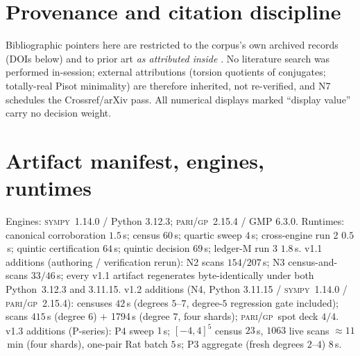 \documentclass[11pt]{article}
\newcommand{\gp}{\textsc{pari/gp}}
\newcommand{\sy}{\textsc{sympy}}
\theoremstyle{definition}
\begin{document}
\section{Provenance and citation discipline}\label{sec:provenance}

Bibliographic pointers here are restricted to the corpus's own archived records
(DOIs below) and to prior art \emph{as attributed inside}
\cite[Rem.~7.20 and refs.~14--16]{relcharge}. No literature search was performed
in-session; external attributions (torsion quotients of conjugates; totally-real
Pisot minimality) are therefore inherited, not re-verified, and N7 schedules the
Crossref/arXiv pass. All numerical displays marked ``display value'' carry no
decision weight.

\appendix

\section{Artifact manifest, engines, runtimes}\label{app:manifest}

Engines: \sy~1.14.0 / Python 3.12.3; \gp~2.15.4 / GMP 6.3.0. Runtimes:
canonical corroboration $1.5$\,s; census $60$\,s; quartic sweep $4$\,s;
cross-engine run 2 $0.5$\,s; quintic certification $64$\,s; quintic decision
$69$\,s; ledger-M run 3 $1.8$\,s. v1.1 additions (authoring / verification
rerun): N2 scans $154/207$\,s; N3 census-and-scans $33/46$\,s; every v1.1
artifact regenerates byte-identically under both Python~3.12.3 and 3.11.15.
v1.2 additions (N4, Python 3.11.15 / \sy~1.14.0 / \gp~2.15.4): censuses
$42$\,s (degrees $5$--$7$, degree-$5$ regression gate included); scans
$415$\,s (degree $6$) $+$ 1794\,s (degree $7$, four shards); \gp\ spot
deck $4/4$. v1.3 additions (P-series): P4 sweep $1$\,s; $[-4,4]^5$ census
$23$\,s, $1063$ live scans $\approx$$11$\,min (four shards), one-pair Rat
batch $5$\,s; P3 aggregate (fresh degrees $2$--$4$) $8$\,s.
\end{document}
